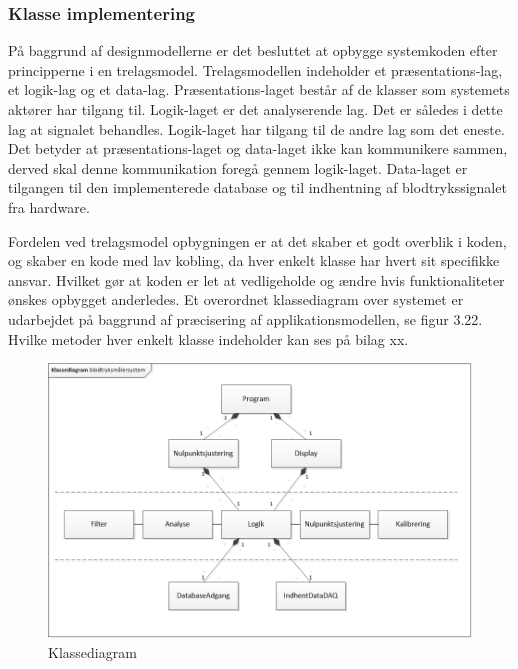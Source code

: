 \subsubsection{Klasse implementering}
På baggrund af designmodellerne er det besluttet at opbygge systemkoden efter principperne i en trelagsmodel. Trelagsmodellen indeholder et præsentations-lag, et logik-lag og et data-lag. Præsentations-laget består af de klasser som systemets aktører har tilgang til. Logik-laget er det analyserende lag. Det er således i dette lag at signalet behandles. Logik-laget har tilgang til de andre lag som det eneste. Det betyder at præsentations-laget og data-laget ikke kan kommunikere sammen, derved skal denne kommunikation foregå gennem logik-laget. Data-laget er tilgangen til den implementerede database og til indhentning af blodtrykssignalet fra hardware.

Fordelen ved trelagsmodel opbygningen er at det skaber et godt overblik i koden, og skaber en kode med lav kobling, da hver enkelt klasse har hvert sit specifikke ansvar. Hvilket gør at koden er let at vedligeholde og ændre hvis funktionaliteter ønskes opbygget anderledes. Et overordnet klassediagram over systemet er udarbejdet på baggrund af præcisering af applikationsmodellen, se figur 3.22. Hvilke metoder hver enkelt klasse indeholder kan ses på bilag xx.
\begin{figure}[H]
	\centering
	\includegraphics[width=1.0\textwidth]{Figurer/Klassediagram}
	\caption{Klassediagram}
\end{figure}


